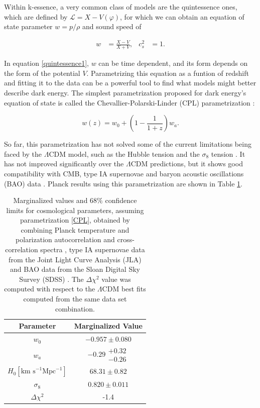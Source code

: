 \documentclass[openany,a4paper,12pt,oneside]{book}
\begin{document}
\begin{spacing}{1.5}
Within k-essence, a very common class of models are the quintessence ones, which are defined by $\mathcal{L}=X-V(\varphi)$, for which we can obtain an equation of state parameter $w=p/\rho$ and sound speed of

\begin{align}\label{quintessence1}
	w&=\frac{X-V}{X+V}, & c_s^2&=1.
\end{align}

In equation \eqref{quintessence1}, $w$ can be time dependent, and its form depends on the form of the potential $V$. Parametrizing this equation as a funtion of redshift and fitting it to the data can be a powerful tool to find what models might better describe dark energy. The simplest parametrization proposed for dark energy's equation of state is called the Chevallier-Polarski-Linder (CPL) parametrization \cite{CPL_DE_parametrization,DE_models}:

\begin{equation}\label{CPL}
    w(z)=w_0+\left(1-\frac{1}{1+z}\right)w_a.
\end{equation}


So far, this parametrization has not solved some of the current limitations being faced by the $\Lambda$CDM model, such as the Hubble tension \cite{Hubble_tension_review} and the $\sigma_8$ tension \cite{Planck_results}. It has not improved significantly over the $\Lambda$CDM predictions, but it shows good compatibility with CMB, type IA supernovae and baryon acoustic oscillations (BAO) data \cite{Planck_results}. Planck results using this parametrization are shown in Table \ref{tab:planck_CPL}.

\begin{table}[!htb]
    \centering
    \begin{tabular}{cc} \hline
     Parameter & Marginalized Value \\ \hline
     $w_0$ & $-0.957\pm0.080$\\
     $w_a$ & $-0.29\substack{+0.32 \\ -0.26}$\\
     $H_0 [\text{km s}^{-1}\text{Mpc}^{-1}]$ & $68.31\pm0.82$ \\
     $\sigma_8$ & $0.820\pm 0.011$\\ \hline
     $\Delta \chi^2$ & -1.4 \\ \hline
    \end{tabular}
    \caption{Marginalized values and $68\%$ confidence limits for cosmological parameters, assuming parametrization \eqref{CPL}, obtained by combining Planck temperature and polarization autocorrelation and cross-correlation spectra \cite{Planck_spectra}, type IA supernovae data from the Joint Light Curve Analysis (JLA) \cite{JLA} and BAO data from the Sloan Digital Sky Survey (SDSS) \cite{SDSS}. The $\Delta \chi^2$ value was computed with respect to the $\Lambda$CDM best fits computed from the same data set combination.}
    \label{tab:planck_CPL}
\end{table}


\end{spacing}
\end{document}
